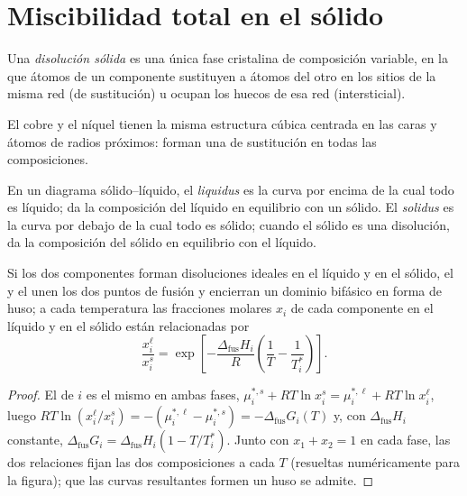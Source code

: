 \section{Miscibilidad total en el sólido}

\begin{definition}\label{def:b2:solid-liquid-diagrams:solid-solution}
Una \emph{disolución sólida} es una única fase cristalina de
composición variable, en la que átomos de un componente sustituyen a átomos del
otro en los sitios de la misma red (de sustitución) u ocupan los huecos de
esa red (intersticial).
\end{definition}

El cobre y el níquel tienen la misma estructura cúbica centrada en las caras y átomos de radios
próximos: forman una  de sustitución en todas las composiciones.

\begin{definition}\label{def:b2:solid-liquid-diagrams:liquidus}
En un diagrama sólido--líquido, el \emph{liquidus} es la curva
por encima de la cual todo es líquido; da la composición del líquido en
equilibrio con un sólido. El \emph{solidus} es la curva por debajo de
la cual todo es sólido; cuando el sólido es una disolución, da la
composición del sólido en equilibrio con el líquido.
\end{definition}

\begin{proposition}[El huso]\label{prop:b2:solid-liquid-diagrams:lens}
Si los dos componentes forman disoluciones ideales en el líquido y en el sólido,
el  y el  unen los dos puntos de fusión y encierran un
dominio bifásico en forma de huso; a cada temperatura las fracciones molares $x_i$ de
cada componente en el líquido y en el sólido están relacionadas por
\[
  \frac{x_i^{\ell}}{x_i^{s}} = \exp\left[-\frac{\Delta_{\text{fus}}H_i}{R}\left(\frac1T - \frac1{T_i^*}\right)\right] .
\]
\end{proposition}

\begin{proof}
El  de $i$ es el mismo en ambas fases, $\mu_i^{*,s} +
RT\ln x_i^s = \mu_i^{*,\ell} + RT\ln x_i^\ell$, luego $RT\ln(x_i^\ell/x_i^s) =
-(\mu_i^{*,\ell} - \mu_i^{*,s}) = -\Delta_{\text{fus}}G_i(T)$ y, con
$\Delta_{\text{fus}}H_i$ constante, $\Delta_{\text{fus}}G_i = \Delta_{\text{fus}}H_i(1 - T/T_i^*)$.
Junto con $x_1 + x_2 = 1$ en cada fase, las dos relaciones fijan las dos
composiciones a cada $T$ (resueltas numéricamente para la figura); que las
curvas resultantes formen un huso se admite.
\end{proof}

